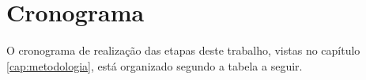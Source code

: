 \chapter{Cronograma}\label{cap:cronograma}
O cronograma de realização das etapas deste trabalho, vistas no capítulo \ref{cap:metodologia}, está organizado segundo a tabela a seguir. %


